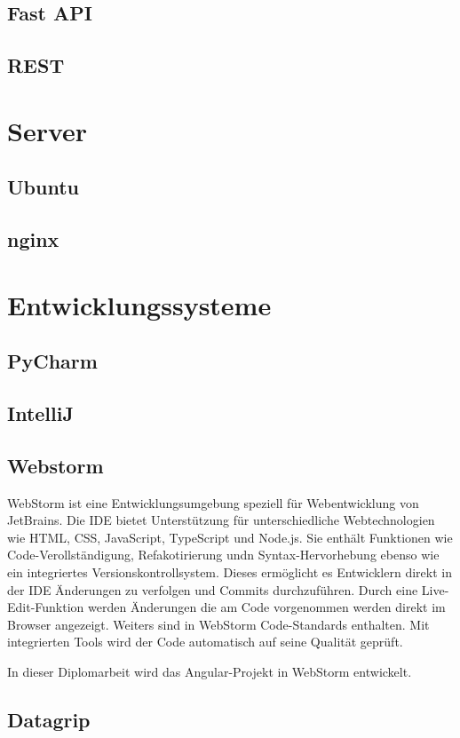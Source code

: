 \documentclass{report}
\begin{document}
\subsection{Fast API}
\subsection{REST}

\section{Server}
\subsection{Ubuntu}
\subsection{nginx}

\section{Entwicklungssysteme}
\subsection{PyCharm}
\subsection{IntelliJ}
\subsection{Webstorm}
WebStorm ist eine Entwicklungsumgebung speziell für Webentwicklung von JetBrains. Die IDE bietet Unterstützung für unterschiedliche Webtechnologien wie HTML, CSS, JavaScript, TypeScript und Node.js. Sie enthält Funktionen wie Code-Verollständigung, Refakotirierung undn Syntax-Hervorhebung ebenso wie ein integriertes Versionskontrollsystem. Dieses ermöglicht es Entwicklern direkt in der IDE Änderungen zu verfolgen und Commits durchzuführen. Durch eine Live-Edit-Funktion werden Änderungen die am Code vorgenommen werden direkt im Browser angezeigt. Weiters sind in WebStorm Code-Standards enthalten. Mit integrierten Tools wird der Code automatisch auf seine Qualität geprüft.

In dieser Diplomarbeit wird das Angular-Projekt in WebStorm entwickelt.
\subsection{Datagrip}
\end{document}
